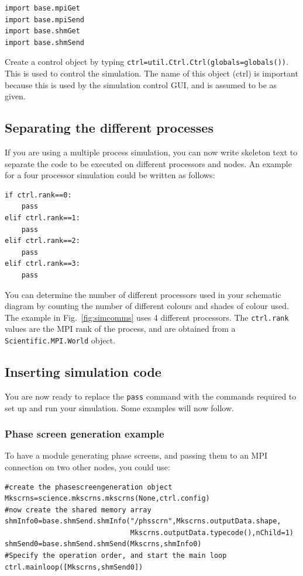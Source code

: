 \documentclass{article}
\begin{document}
\begin{verbatim}
import base.mpiGet
import base.mpiSend
import base.shmGet
import base.shmSend
\end{verbatim}

Create a control object by typing
\texttt{ctrl=util.Ctrl.Ctrl(globals=globals())}.  This is used to
control the simulation.  The name of this object (ctrl) is important
because this is used by the simulation control GUI, and is assumed to
be as given.

\subsection{Separating the different processes}
If you are using a multiple process simulation, you can now write
skeleton text to separate the code to be executed on different
processors and nodes.  An example for a four processor simulation
could be written as follows:

\begin{verbatim}
if ctrl.rank==0:
    pass
elif ctrl.rank==1:
    pass
elif ctrl.rank==2:
    pass
elif ctrl.rank==3:
    pass
\end{verbatim}

You can determine the number of different processors used in your
schematic diagram by counting the number of different colours and
shades of colour used.  The example in Fig.~\ref{fig:simcomms} uses
4 different processors.  The \texttt{ctrl.rank} values are the MPI
rank of the process, and are obtained from a
\texttt{Scientific.MPI.World} object.

\subsection{Inserting simulation code}
You are now ready to replace the \texttt{pass} command with the
commands required to set up and run your simulation.  Some examples
will now follow.

\subsubsection{Phase screen generation example}
To have a module generating phase screens, and passing them to an MPI
connection on two other nodes, you could use:

\begin{verbatim}
#create the phasescreengeneration object
Mkscrns=science.mkscrns.mkscrns(None,ctrl.config)
#now create the shared memory array
shmInfo0=base.shmSend.shmInfo("/phsscrn",Mkscrns.outputData.shape,
                              Mkscrns.outputData.typecode(),nChild=1)
shmSend0=base.shmSend.shmSend(Mkscrns,shmInfo0)
#Specify the operation order, and start the main loop
ctrl.mainloop([Mkscrns,shmSend0])
\end{verbatim}
\end{document}
